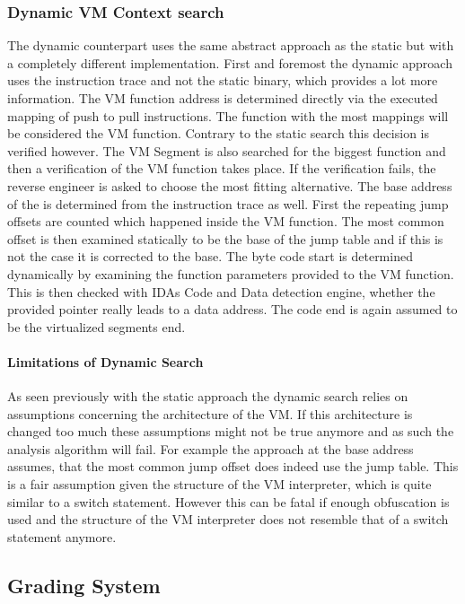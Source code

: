 \documentclass[10pt,twoside,a4paper,bibliography=totoc]{scrbook}
\begin{document}
\subsubsection{Dynamic VM Context search} The dynamic counterpart uses the same abstract approach as the static but with a completely different implementation. 
First and foremost the dynamic approach uses the instruction trace and not the static binary, which provides a lot more information. 
The VM function address is determined directly via the executed mapping of push to pull instructions. The function with the most mappings will be considered the VM function.
Contrary to the static search this decision is verified however. The VM Segment is also searched for the biggest function and then a verification of the VM function takes place. 
If the verification fails, the reverse engineer is asked to choose the most fitting alternative.
The base address of the is determined from the instruction trace as well. 
First the repeating jump offsets are counted which happened inside the VM function. The most common offset is then examined statically to be the base of the jump table and if this is not the case it is corrected to the base.
The byte code start is determined dynamically by examining the function parameters provided to the VM function.
This is then checked with IDAs Code and Data detection engine, whether the provided pointer really leads to a data address. 
The code end is again assumed to be the virtualized segments end.

\paragraph*{Limitations of Dynamic Search} As seen previously with the static approach the dynamic search relies on assumptions concerning the architecture of the VM. 
If this architecture is changed too much these assumptions might not be true anymore and as such the analysis algorithm will fail.
For example the approach at the base address assumes, that the most common jump offset does indeed use the jump table. 
This is a fair assumption given the structure of the VM interpreter, which is quite similar to a switch statement. 
However this can be fatal if enough obfuscation is used and the structure of the VM interpreter does not resemble that of a switch statement anymore. 


\subsection{Grading System}
\end{document}
